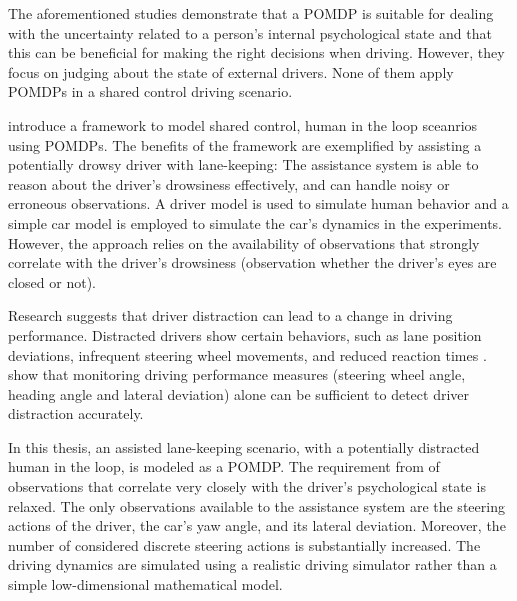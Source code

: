 The aforementioned studies demonstrate that a POMDP is suitable for dealing with the uncertainty related to a person's internal psychological state and that this can be beneficial for making the right decisions when driving. However, they focus on judging about the state of external drivers. None of them apply POMDPs in a shared control driving scenario. 

\cite{hitl_pomdp} introduce a framework to model shared control, human in the loop sceanrios using POMDPs. The benefits of the framework are exemplified by assisting a potentially drowsy driver with lane-keeping: The assistance system is able to reason about the driver's drowsiness effectively, and can handle noisy or erroneous observations. A driver model is used to simulate human behavior and a simple car model is employed to simulate the car's dynamics in the experiments. However, the approach relies on the availability of observations that strongly correlate with the driver's drowsiness (observation whether the driver's eyes are closed or not).


Research suggests that driver distraction can lead to a change in driving performance. Distracted drivers show certain behaviors, such as lane position deviations, infrequent steering wheel movements, and reduced reaction times \parencite{driver-distraction-review}. \cite{dist-det-perf} show that monitoring driving performance measures (steering wheel angle, heading angle and lateral deviation) alone can be sufficient to detect driver distraction accurately.

In this thesis, an assisted lane-keeping scenario, with a potentially distracted human in the loop, is modeled as a POMDP. The requirement from \cite{hitl_pomdp} of observations that correlate very closely with the driver's psychological state is relaxed. The only observations available to the assistance system are the steering actions of the driver, the car's yaw angle, and its lateral deviation. Moreover, the number of considered discrete steering actions is substantially increased. The driving dynamics are simulated using a realistic driving simulator rather than a simple low-dimensional mathematical model.


